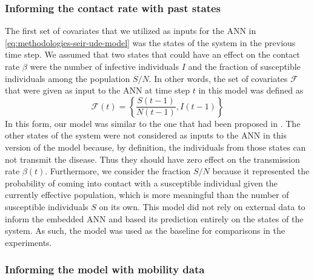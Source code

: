 \subsubsection{Informing the contact rate with past states}
The first set of covariates that we utilized as inputs for the \gls{ANN} in \autoref{eq:methodologies-seir-ude-model} was the states of the system in the previous time step.
We assumed that two states that could have an effect on the contact rate $\beta$ were the number of infective individuals $I$ and the fraction of susceptible individuals among the population $S/N$.
In other words, the set of covariates $\mathcal{F}$ that were given as input to the \gls{ANN} at time step $t$ in this model was defined as
\begin{equation*}
    \mathcal{F}(t) = \left\lbrace \frac{S(t-1)}{N(t-1)}, I(t-1) \right\rbrace
\end{equation*}
In this form, our model was similar to the one that had been proposed in \cite{dandekarMachineLearningAidedGlobal2020a}.
The other states of the system were not considered as inputs to the \gls{ANN} in this version of the model because, by definition, the individuals from those states can not transmit the disease.
Thus they should have zero effect on the transmission rate $\beta(t)$.
Furthermore, we consider the fraction $S/N$ because it represented the probability of coming into contact with a susceptible individual given the currently effective population, which is more meaningful than the number of susceptible individuals $S$ on its own.
This model did not rely on external data to inform the embedded \gls{ANN} and based its prediction entirely on the states of the system.
As such, the model was used as the baseline for comparisons in the experiments.

\subsubsection{Informing the model with mobility data}

